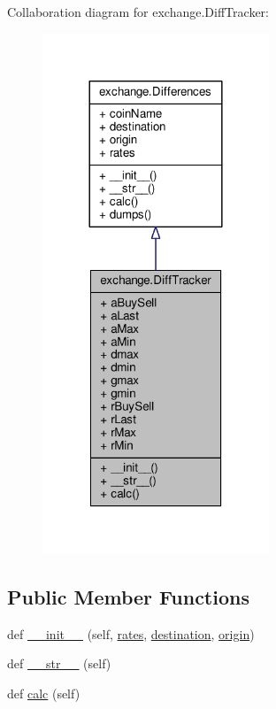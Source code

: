Collaboration diagram for exchange.\+Diff\+Tracker\+:\nopagebreak
\begin{figure}[H]
\begin{center}
\leavevmode
\includegraphics[width=192pt]{classexchange_1_1_diff_tracker__coll__graph}
\end{center}
\end{figure}
\subsection*{Public Member Functions}
\begin{DoxyCompactItemize}
\item 
def \hyperlink{classexchange_1_1_diff_tracker_ab9d1d8ef6d877d209ace871e195b284c}{\+\_\+\+\_\+init\+\_\+\+\_\+} (self, \hyperlink{classexchange_1_1_differences_a821ecbc04dae3081f634a28d377c69c3}{rates}, \hyperlink{classexchange_1_1_differences_a0092f9963e867db55e7ea2f0bab1b07e}{destination}, \hyperlink{classexchange_1_1_differences_a25acbe37294f8b4eb5bf909cd84a0b9d}{origin})
\item 
def \hyperlink{classexchange_1_1_diff_tracker_a72214c03506722b0554e433615bff766}{\+\_\+\+\_\+str\+\_\+\+\_\+} (self)
\item 
def \hyperlink{classexchange_1_1_diff_tracker_a5289683bd2bd43e75e0062704df53736}{calc} (self)
\end{DoxyCompactItemize}
